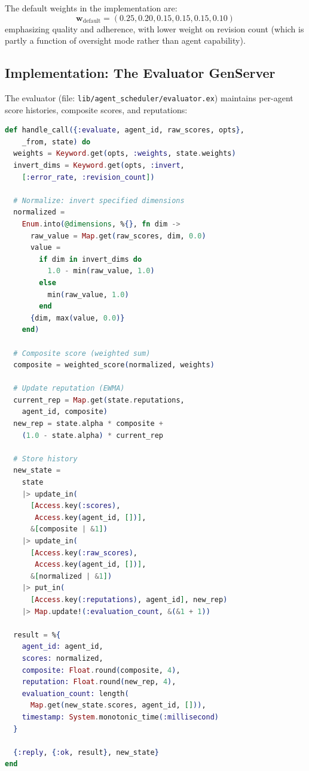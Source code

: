 \documentclass[12pt,a4paper]{article}
\theoremstyle{definition}
\theoremstyle{remark}
\begin{document}
The default weights in the implementation are:
\begin{equation*}
  \mathbf{w}_{\text{default}} = (0.25, 0.20, 0.15, 0.15, 0.15, 0.10)
\end{equation*}
emphasizing quality and adherence, with lower weight on revision count (which is partly a function of oversight mode rather than agent capability).

\subsection{Implementation: The Evaluator GenServer}

The evaluator (file: \texttt{lib/agent\_scheduler/evaluator.ex}) maintains per-agent score histories, composite scores, and reputations:

\begin{lstlisting}[language=elixir, caption={Evaluation with score normalization and EWMA (from \texttt{evaluator.ex})}, label={lst:evaluator}]
def handle_call({:evaluate, agent_id, raw_scores, opts},
    _from, state) do
  weights = Keyword.get(opts, :weights, state.weights)
  invert_dims = Keyword.get(opts, :invert,
    [:error_rate, :revision_count])

  # Normalize: invert specified dimensions
  normalized =
    Enum.into(@dimensions, %{}, fn dim ->
      raw_value = Map.get(raw_scores, dim, 0.0)
      value =
        if dim in invert_dims do
          1.0 - min(raw_value, 1.0)
        else
          min(raw_value, 1.0)
        end
      {dim, max(value, 0.0)}
    end)

  # Composite score (weighted sum)
  composite = weighted_score(normalized, weights)

  # Update reputation (EWMA)
  current_rep = Map.get(state.reputations,
    agent_id, composite)
  new_rep = state.alpha * composite +
    (1.0 - state.alpha) * current_rep

  # Store history
  new_state =
    state
    |> update_in(
      [Access.key(:scores),
       Access.key(agent_id, [])],
      &[composite | &1])
    |> update_in(
      [Access.key(:raw_scores),
       Access.key(agent_id, [])],
      &[normalized | &1])
    |> put_in(
      [Access.key(:reputations), agent_id], new_rep)
    |> Map.update!(:evaluation_count, &(&1 + 1))

  result = %{
    agent_id: agent_id,
    scores: normalized,
    composite: Float.round(composite, 4),
    reputation: Float.round(new_rep, 4),
    evaluation_count: length(
      Map.get(new_state.scores, agent_id, [])),
    timestamp: System.monotonic_time(:millisecond)
  }

  {:reply, {:ok, result}, new_state}
end
\end{lstlisting}
\end{document}

